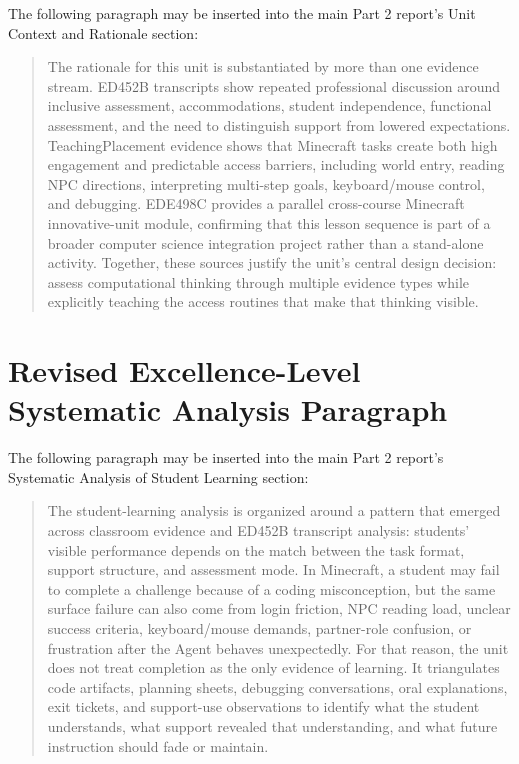 \documentclass[12pt]{article}
\begin{document}
The following paragraph may be inserted into the main Part 2 report's Unit Context and Rationale section:

\begin{quote}
The rationale for this unit is substantiated by more than one evidence stream. ED452B transcripts show repeated professional discussion around inclusive assessment, accommodations, student independence, functional assessment, and the need to distinguish support from lowered expectations. TeachingPlacement evidence shows that Minecraft tasks create both high engagement and predictable access barriers, including world entry, reading NPC directions, interpreting multi-step goals, keyboard/mouse control, and debugging. EDE498C provides a parallel cross-course Minecraft innovative-unit module, confirming that this lesson sequence is part of a broader computer science integration project rather than a stand-alone activity. Together, these sources justify the unit's central design decision: assess computational thinking through multiple evidence types while explicitly teaching the access routines that make that thinking visible.
\end{quote}

\section{Revised Excellence-Level Systematic Analysis Paragraph}

The following paragraph may be inserted into the main Part 2 report's Systematic Analysis of Student Learning section:

\begin{quote}
The student-learning analysis is organized around a pattern that emerged across classroom evidence and ED452B transcript analysis: students' visible performance depends on the match between the task format, support structure, and assessment mode. In Minecraft, a student may fail to complete a challenge because of a coding misconception, but the same surface failure can also come from login friction, NPC reading load, unclear success criteria, keyboard/mouse demands, partner-role confusion, or frustration after the Agent behaves unexpectedly. For that reason, the unit does not treat completion as the only evidence of learning. It triangulates code artifacts, planning sheets, debugging conversations, oral explanations, exit tickets, and support-use observations to identify what the student understands, what support revealed that understanding, and what future instruction should fade or maintain.
\end{quote}
\end{document}
